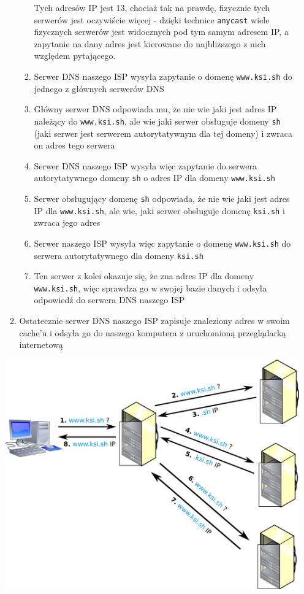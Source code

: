 \documentclass[12pt]{article}
\begin{document}
\begin{enumerate}
\begin{enumerate}
\begin{enumerate}
                    Tych adresów IP jest 13, chociaż tak na prawdę, fizycznie tych serwerów jest oczywiście więcej
                    - dzięki technice \texttt{anycast} wiele fizycznych serwerów jest widocznych pod tym samym adresem IP, a zapytanie na dany adres
                    jest kierowane do najbliższego z nich względem pytającego.
                \item Serwer DNS naszego ISP wysyła zapytanie o domenę \texttt{www.ksi.sh} do jednego z głównych serwerów DNS
                \item Główny serwer DNS odpowiada mu, że nie wie jaki jest adres IP należący do \texttt{www.ksi.sh}, ale wie jaki serwer obsługuje domeny \texttt{sh} (jaki serwer jest serwerem autorytatywnym dla tej domeny)
                      i zwraca on adres tego serwera
                \item Serwer DNS naszego ISP wysyła więc zapytanie do serwera autorytatywnego domeny \texttt{sh} o adres IP dla domeny \texttt{www.ksi.sh}
                \item Serwer obsługujący domenę \texttt{sh} odpowiada, że nie wie jaki jest adres IP dla \texttt{www.ksi.sh}, ale wie, jaki serwer obsługuje domenę \texttt{ksi.sh} i zwraca jego adres
                \item Serwer naszego ISP wysyła więc zapytanie o domenę \texttt{www.ksi.sh} do serwera autorytatywnego dla domeny \texttt{ksi.sh}
                \item Ten serwer z kolei okazuje się, że zna adres IP dla domeny \texttt{www.ksi.sh}, więc sprawdza go w swojej bazie danych i odsyła odpowiedź do serwera DNS naszego ISP
            \end{enumerate}
            \item Ostatecznie serwer DNS naszego ISP zapisuje znaleziony adres w swoim cache'u i odsyła go do naszego komputera z uruchomioną przeglądarką internetową
        \end{enumerate}

        \begin{center}
            \includegraphics[width=\linewidth]{dns_resolving.png}
        \end{center}


\end{enumerate}
\end{document}
